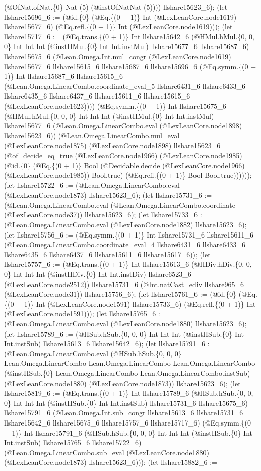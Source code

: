 \documentclass[11pt]{article}
\begin{document}
(@OfNat.ofNat.\{0\} Nat (5) (@instOfNatNat (5)))) llshare15623\_6); (let llshare15696\_6 := (@id.\{0\} (@Eq.\{(0 + 1)\} Int (@LexLeanCore.node1619) llshare15677\_6) (@Eq.refl.\{(0 + 1)\} Int (@LexLeanCore.node1619))); (let llshare15717\_6 := (@Eq.trans.\{(0 + 1)\} Int llshare15642\_6 (@HMul.hMul.\{0, 0, 0\} Int Int Int (@instHMul.\{0\} Int Int.instMul) llshare15677\_6 llshare15687\_6) llshare15675\_6 (@Lean.Omega.Int.mul\_congr (@LexLeanCore.node1619) llshare15677\_6 llshare15615\_6 llshare15687\_6 llshare15696\_6 (@Eq.symm.\{(0 + 1)\} Int llshare15687\_6 llshare15615\_6 (@Lean.Omega.LinearCombo.coordinate\_eval\_5 llshare6431\_6 llshare6433\_6 llshare6435\_6 llshare6437\_6 llshare15611\_6 llshare15615\_6 (@LexLeanCore.node1623)))) (@Eq.symm.\{(0 + 1)\} Int llshare15675\_6 (@HMul.hMul.\{0, 0, 0\} Int Int Int (@instHMul.\{0\} Int Int.instMul) llshare15677\_6 (@Lean.Omega.LinearCombo.eval (@LexLeanCore.node1898) llshare15623\_6)) (@Lean.Omega.LinearCombo.mul\_eval (@LexLeanCore.node1875) (@LexLeanCore.node1898) llshare15623\_6 (@of\_decide\_eq\_true (@LexLeanCore.node1966) (@LexLeanCore.node1985) (@id.\{0\} (@Eq.\{(0 + 1)\} Bool (@Decidable.decide (@LexLeanCore.node1966) (@LexLeanCore.node1985)) Bool.true) (@Eq.refl.\{(0 + 1)\} Bool Bool.true)))))); (let llshare15722\_6 := (@Lean.Omega.LinearCombo.eval (@LexLeanCore.node1873) llshare15623\_6); (let llshare15731\_6 := (@Lean.Omega.LinearCombo.eval (@Lean.Omega.LinearCombo.coordinate (@LexLeanCore.node37)) llshare15623\_6); (let llshare15733\_6 := (@Lean.Omega.LinearCombo.eval (@LexLeanCore.node1882) llshare15623\_6); (let llshare15756\_6 := (@Eq.symm.\{(0 + 1)\} Int llshare15731\_6 llshare15611\_6 (@Lean.Omega.LinearCombo.coordinate\_eval\_4 llshare6431\_6 llshare6433\_6 llshare6435\_6 llshare6437\_6 llshare15611\_6 llshare15617\_6)); (let llshare15757\_6 := (@Eq.trans.\{(0 + 1)\} Int llshare15613\_6 (@HDiv.hDiv.\{0, 0, 0\} Int Int Int (@instHDiv.\{0\} Int Int.instDiv) llshare6523\_6 (@LexLeanCore.node2512)) llshare15731\_6 (@Int.natCast\_ediv llshare965\_6 (@LexLeanCore.node31)) llshare15756\_6); (let llshare15761\_6 := (@id.\{0\} (@Eq.\{(0 + 1)\} Int (@LexLeanCore.node1591) llshare15733\_6) (@Eq.refl.\{(0 + 1)\} Int (@LexLeanCore.node1591))); (let llshare15765\_6 := (@Lean.Omega.LinearCombo.eval (@LexLeanCore.node1880) llshare15623\_6); (let llshare15789\_6 := (@HSub.hSub.\{0, 0, 0\} Int Int Int (@instHSub.\{0\} Int Int.instSub) llshare15613\_6 llshare15642\_6); (let llshare15791\_6 := (@Lean.Omega.LinearCombo.eval (@HSub.hSub.\{0, 0, 0\} Lean.Omega.LinearCombo Lean.Omega.LinearCombo Lean.Omega.LinearCombo (@instHSub.\{0\} Lean.Omega.LinearCombo Lean.Omega.LinearCombo.instSub) (@LexLeanCore.node1880) (@LexLeanCore.node1873)) llshare15623\_6); (let llshare15819\_6 := (@Eq.trans.\{(0 + 1)\} Int llshare15789\_6 (@HSub.hSub.\{0, 0, 0\} Int Int Int (@instHSub.\{0\} Int Int.instSub) llshare15731\_6 llshare15675\_6) llshare15791\_6 (@Lean.Omega.Int.sub\_congr llshare15613\_6 llshare15731\_6 llshare15642\_6 llshare15675\_6 llshare15757\_6 llshare15717\_6) (@Eq.symm.\{(0 + 1)\} Int llshare15791\_6 (@HSub.hSub.\{0, 0, 0\} Int Int Int (@instHSub.\{0\} Int Int.instSub) llshare15765\_6 llshare15722\_6) (@Lean.Omega.LinearCombo.sub\_eval (@LexLeanCore.node1880) (@LexLeanCore.node1873) llshare15623\_6))); (let llshare15882\_6 := 
\end{document}
